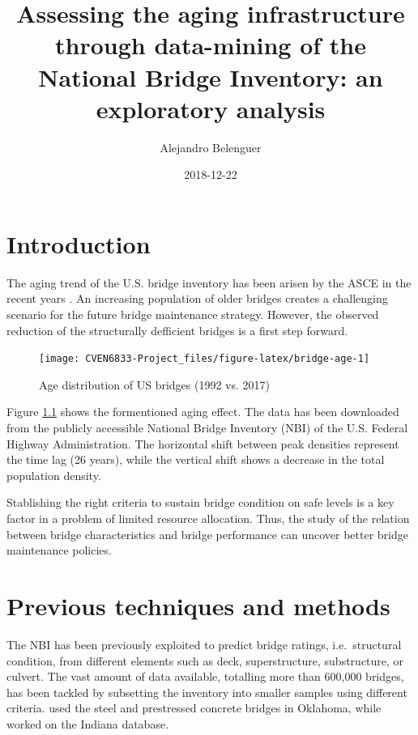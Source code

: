 \documentclass[]{book}
\title{Assessing the aging infrastructure through data-mining of the National
Bridge Inventory: an exploratory analysis}
\author{Alejandro Belenguer}
\date{2018-12-22}
\theoremstyle{definition}
\theoremstyle{definition}
\theoremstyle{definition}
\theoremstyle{remark}
\begin{document}
\maketitle

{
\setcounter{tocdepth}{1}
\tableofcontents
}
\chapter{Introduction}\label{intro}

The aging trend of the U.S. bridge inventory has been arisen by the ASCE
in the recent years \citep{asce2017InfrastructureReport2017}. An
increasing population of older bridges creates a challenging scenario
for the future bridge maintenance strategy. However, the observed
reduction of the structurally defficient bridges is a first step
forward.

\begin{figure}

{\centering \texttt{[image: CVEN6833-Project\_files/figure-latex/bridge-age-1]} 

}

\caption{Age distribution of US bridges (1992 vs. 2017)}\label{fig:bridge-age}
\end{figure}

Figure \ref{fig:bridge-age} shows the formentioned aging effect. The
data has been downloaded from the publicly accessible National Bridge
Inventory (NBI) of the U.S. Federal Highway Administration. The
horizontal shift between peak densities represent the time lag (26
years), while the vertical shift shows a decrease in the total
population density.

Stablishing the right criteria to sustain bridge condition on safe
levels is a key factor in a problem of limited resource allocation.
Thus, the study of the relation between bridge characteristics and
bridge performance can uncover better bridge maintenance policies.

\chapter{Previous techniques and
methods}\label{previous-techniques-and-methods}

The NBI has been previously exploited to predict bridge ratings,
i.e.~structural condition, from different elements such as deck,
superstructure, substructure, or culvert. The vast amount of data
available, totalling more than 600,000 bridges, has been tackled by
subsetting the inventory into smaller samples using different criteria.
\citet{contreras-nietoDevelopmentLinearModels2014} used the steel and
prestressed concrete bridges in Oklahoma, while
\citet{saeedPerformanceEvaluationLife2017} worked on the Indiana
database.
\end{document}
